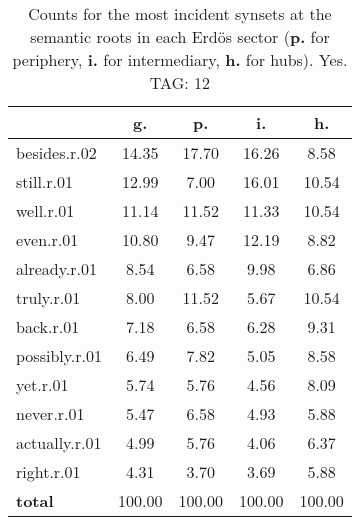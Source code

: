 \begin{table}[h!]
\begin{center}
\begin{tabular}{| l | c | c | c | c |}\hline
 & g. & p. & i. & h. \\\hline
besides.r.02 & 14.35  & 17.70  & 16.26  & 8.58 \\\hline
still.r.01 & 12.99  & 7.00  & 16.01  & 10.54 \\\hline
well.r.01 & 11.14  & 11.52  & 11.33  & 10.54 \\\hline
even.r.01 & 10.80  & 9.47  & 12.19  & 8.82 \\\hline
already.r.01 & 8.54  & 6.58  & 9.98  & 6.86 \\\hline
truly.r.01 & 8.00  & 11.52  & 5.67  & 10.54 \\\hline
back.r.01 & 7.18  & 6.58  & 6.28  & 9.31 \\\hline
possibly.r.01 & 6.49  & 7.82  & 5.05  & 8.58 \\\hline
yet.r.01 & 5.74  & 5.76  & 4.56  & 8.09 \\\hline
never.r.01 & 5.47  & 6.58  & 4.93  & 5.88 \\\hline
actually.r.01 & 4.99  & 5.76  & 4.06  & 6.37 \\\hline
right.r.01 & 4.31  & 3.70  & 3.69  & 5.88 \\\hline
{{\bf total}} & 100.00  & 100.00  & 100.00  & 100.00 \\\hline
\end{tabular}
\caption{Counts for the most incident synsets at the semantic roots in each Erd\"os sector ({\bf p.} for periphery, {\bf i.} for intermediary, {\bf h.} for hubs). Yes. TAG: 12}
\end{center}
\end{table}
